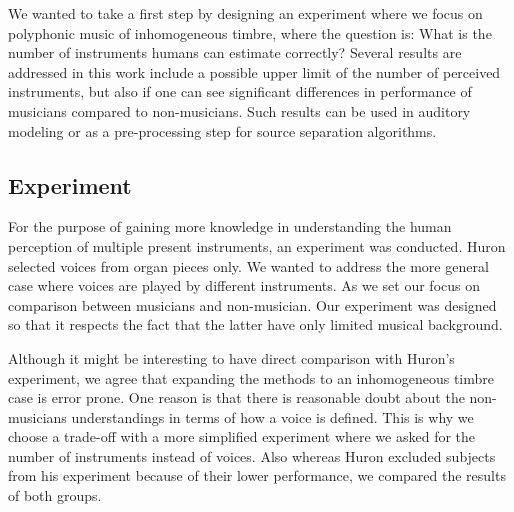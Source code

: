 We wanted to take a first step by designing an experiment where we focus on polyphonic music of inhomogeneous timbre, where the question is: What is the number of instruments humans can estimate correctly? 
Several results are addressed in this work include a possible upper limit of the number of perceived instruments, but also if one can see significant differences in performance of musicians compared to non-musicians. 
Such results can be used in auditory modeling or as a pre-processing step for source separation algorithms.

\subsection{Experiment}
For the purpose of gaining more knowledge in understanding the human perception of multiple present instruments, an experiment was conducted. Huron selected voices from organ pieces only. We wanted to address the more general case where voices are played by different instruments. 
As we set our focus on comparison between musicians and non-musician. 
Our experiment was designed so that it respects the fact that the latter have only limited musical background.
\par
Although it might be interesting to have direct comparison with Huron's experiment, we agree that expanding the methods to an inhomogeneous timbre case is error prone. One reason is that there is reasonable doubt about the non-musicians understandings in terms of how a voice is defined. This is why we choose a trade-off with a more simplified experiment where we asked for the number of instruments instead of voices. Also whereas Huron \cite{huron89}  excluded subjects from his experiment because of their lower performance, we compared the results of both groups.

